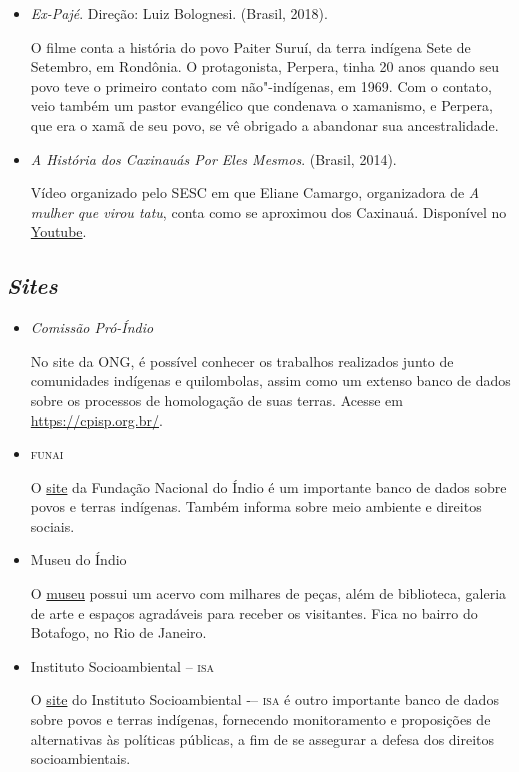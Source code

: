 \documentclass[11pt]{extarticle}
\begin{document}
\begin{itemize}
\item \textit{Ex-Pajé}. Direção: Luiz Bolognesi. (Brasil, 2018).

O filme conta a história do povo Paiter Suruí, da terra indígena Sete de Setembro, em Rondônia. O protagonista, Perpera, tinha 20 anos quando seu povo teve o primeiro contato com não"-indígenas, em 1969. Com o contato, veio também um pastor evangélico que condenava o xamanismo, e Perpera, que era o xamã de seu povo, se vê obrigado a abandonar sua ancestralidade.

\item \textit{A História dos Caxinauás Por Eles Mesmos}. (Brasil, 2014).

Vídeo organizado pelo SESC em que Eliane Camargo, organizadora de \textit{A mulher que virou tatu}, conta como se aproximou dos Caxinauá. Disponível no \href{https://youtu.be/80Wip9XFtMU}{Youtube}.

\end{itemize}

\subsection{\emph{Sites}}

\begin{itemize}

\item \textit{Comissão Pró-Índio}

No site da ONG, é possível conhecer os trabalhos realizados junto de comunidades indígenas e quilombolas, assim como um extenso banco de dados sobre os processos de homologação de suas terras. Acesse em \url{https://cpisp.org.br/}.
\item \textsc{funai}

O \href{http://www.gov.br/funai}{site} da Fundação Nacional do Índio é um importante banco de dados sobre povos e terras indígenas. Também informa sobre meio ambiente e direitos sociais.

\item Museu do Índio

O \href{http://www.museudoindio.gov.br/}{museu} possui um acervo com milhares de peças, além de biblioteca, galeria de arte e espaços agradáveis para receber os visitantes. Fica no bairro do Botafogo, no Rio de Janeiro.

\item Instituto Socioambiental -- \textsc{isa}

O \href{https://www.socioambiental.org/pt-br}{site} do Instituto Socioambiental -– \textsc{isa} é outro importante banco de dados 
sobre povos e terras indígenas, fornecendo monitoramento e proposições de alternativas às políticas públicas, a fim de se assegurar a defesa dos direitos socioambientais. 

\end{itemize}
\end{document}
